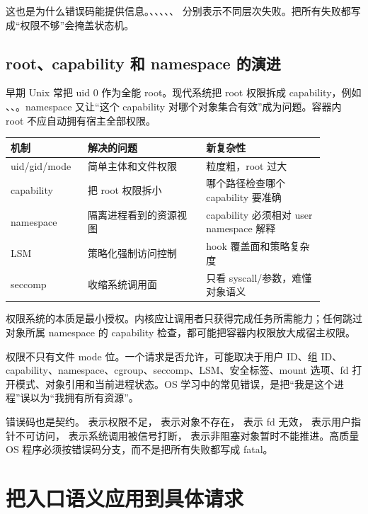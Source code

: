 这也是为什么错误码能提供信息。、、、、、 分别表示不同层次失败。把所有失败都写成“权限不够”会掩盖状态机。

\subsection{root、capability 和 namespace 的演进}

早期 Unix 常把 uid 0 作为全能 root。现代系统把 root 权限拆成 capability，例如 、、。namespace 又让“这个 capability 对哪个对象集合有效”成为问题。容器内 root 不应自动拥有宿主全部权限。

\begin{longtable}{|p{0.2\linewidth}|p{0.34\linewidth}|p{0.34\linewidth}|}
\toprule
机制 & 解决的问题 & 新复杂性 \\
\midrule
uid/gid/mode & 简单主体和文件权限 & 粒度粗，root 过大 \\\tablerowrule
capability & 把 root 权限拆小 & 哪个路径检查哪个 capability 要准确 \\\tablerowrule
namespace & 隔离进程看到的资源视图 & capability 必须相对 user namespace 解释 \\\tablerowrule
LSM & 策略化强制访问控制 & hook 覆盖面和策略复杂度 \\\tablerowrule
seccomp & 收缩系统调用面 & 只看 syscall/参数，难懂对象语义 \\
\bottomrule
\end{longtable}

权限系统的本质是最小授权。内核应让调用者只获得完成任务所需能力；任何跳过对象所属 namespace 的 capability 检查，都可能把容器内权限放大成宿主权限。

权限不只有文件 mode 位。一个请求是否允许，可能取决于用户 ID、组 ID、capability、namespace、cgroup、seccomp、LSM、安全标签、mount 选项、fd 打开模式、对象引用和当前进程状态。OS 学习中的常见错误，是把“我是这个进程”误以为“我拥有所有资源”。

错误码也是契约。 表示权限不足， 表示对象不存在， 表示 fd 无效， 表示用户指针不可访问， 表示系统调用被信号打断， 表示非阻塞对象暂时不能推进。高质量 OS 程序必须按错误码分支，而不是把所有失败都写成 fatal。



\section{把入口语义应用到具体请求}

